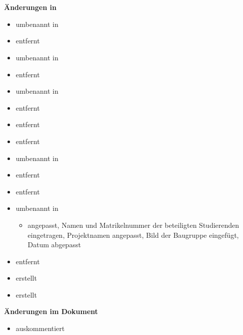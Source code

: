 \section{}
\textbf{Änderungen in }
\begin{itemize}
	\item {} umbenannt in 
	\item {} entfernt
	\item {} umbenannt in 
	\item {} entfernt
	\item {} umbenannt in 
	\item {} entfernt
	\item {} entfernt
	\item {} entfernt
	\item {} umbenannt in 
	\item {} entfernt
	\item {} entfernt
	\item {} umbenannt in 
	    \begin{itemize}
		\item {} angepasst, Namen und Matrikelnummer der beteiligten Studierenden eingetragen, Projektnamen angepasst, Bild der Baugruppe eingefügt, Datum abgepasst
    	\end{itemize}
	\item {} entfernt
	\item {} erstellt
	\item {} erstellt
\end{itemize}
\textbf{Änderungen im Dokument }
    \begin{itemize}
	\item {} auskommentiert
    \end{itemize}


